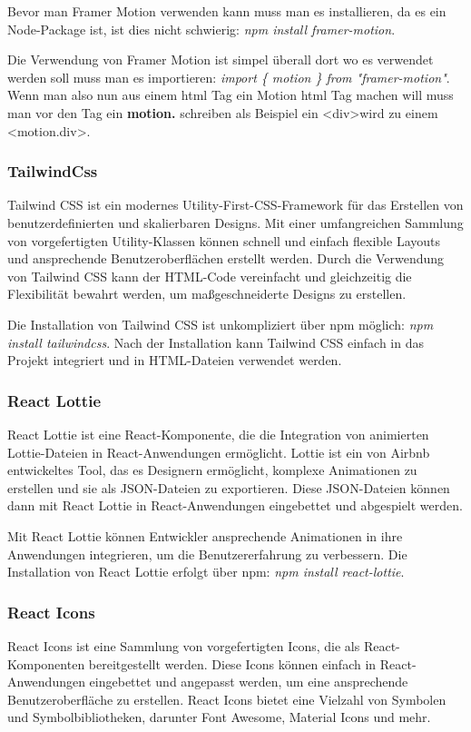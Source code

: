 Bevor man Framer Motion verwenden kann muss man es installieren, da es ein Node-Package ist, ist dies nicht schwierig: \emph{npm install framer-motion}.

Die Verwendung von Framer Motion ist simpel überall dort wo es verwendet werden soll muss man es importieren: \emph{import \{ motion \} from "framer-motion"}.
Wenn man also nun aus einem html Tag ein Motion html Tag machen will muss man vor den Tag ein \textbf{motion.} schreiben als Beispiel ein \textless div\textgreater wird zu einem \textless motion.div\textgreater.   



\subsubsection*{TailwindCss}
Tailwind CSS ist ein modernes Utility-First-CSS-Framework für das Erstellen von benutzerdefinierten und skalierbaren Designs. Mit einer umfangreichen Sammlung von vorgefertigten Utility-Klassen können schnell und einfach flexible Layouts und ansprechende Benutzeroberflächen erstellt werden. Durch die Verwendung von Tailwind CSS kann der HTML-Code vereinfacht und gleichzeitig die Flexibilität bewahrt werden, um maßgeschneiderte Designs zu erstellen. 

Die Installation von Tailwind CSS ist unkompliziert über npm möglich: \emph{npm install tailwindcss}. Nach der Installation kann Tailwind CSS einfach in das Projekt integriert und in HTML-Dateien verwendet werden.

\subsubsection*{React Lottie}
React Lottie ist eine React-Komponente, die die Integration von animierten Lottie-Dateien in React-Anwendungen ermöglicht. Lottie ist ein von Airbnb entwickeltes Tool, das es Designern ermöglicht, komplexe Animationen zu erstellen und sie als JSON-Dateien zu exportieren. Diese JSON-Dateien können dann mit React Lottie in React-Anwendungen eingebettet und abgespielt werden. 

Mit React Lottie können Entwickler ansprechende Animationen in ihre Anwendungen integrieren, um die Benutzererfahrung zu verbessern. Die Installation von React Lottie erfolgt über npm: \emph{npm install react-lottie}.

\subsubsection*{React Icons}
React Icons ist eine Sammlung von vorgefertigten Icons, die als React-Komponenten bereitgestellt werden. Diese Icons können einfach in React-Anwendungen eingebettet und angepasst werden, um eine ansprechende Benutzeroberfläche zu erstellen. React Icons bietet eine Vielzahl von Symbolen und Symbolbibliotheken, darunter Font Awesome, Material Icons und mehr. 

